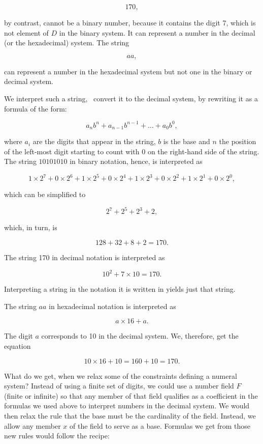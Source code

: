 \documentclass[tikz]{scrreprt}
\begin{document}
\[
170,
\]

by contrast, cannot be a binary number, because
it contains the digit 7, which is not element of $D$
in the binary system.
It can represent a number in the decimal (or the hexadecimal) system. 
The string

\[
aa,
\]

can represent a number in the hexadecimal system
but not one in the binary or decimal system.

We interpret such a string, \ie\ convert it
to the decimal system, by rewriting it 
as a formula of the form:

\[
a_nb^n + a_{n-1}b^{n-1} + \dots + a_0b^0,
\]

where $a_i$ are the digits that appear in the string,
$b$ is the base and $n$ the position of the left-most digit
starting to count with 0 on the right-hand side of the string.
The string $10101010$ in binary notation, hence, is interpreted as

\[
1\times 2^7 + 0\times 2^6 + 1\times 2^5 + 0\times 2^4 + 
1\times 2^3 + 0\times 2^2 + 1\times 2^1 + 0\times 2^0,
\]

which can be simplified to

\[
2^7 + 2^5 + 2^3 + 2,
\]

which, in turn, is

\[
128 + 32 + 8 + 2 = 170.
\]

The string 170 in decimal notation is interpreted as

\[
10^2 + 7\times 10 = 170.
\]

Interpreting a string in the notation it is written in
yields just that string.

The string $aa$ in hexadecimal notation is interpreted as

\[
a\times 16 + a.
\]

The digit $a$ corresponds to 10 in the decimal system.
We, therefore, get the equation

\[
10\times 16 + 10 = 160 + 10 = 170.
\]

What do we get, when we relax some of the constraints
defining a numeral system?
Instead of using a finite set of digits,
we could use a number field $F$ (finite or infinite)
so that any member of that field qualifies as a coefficient
in the formulas we used above to interpret numbers
in the decimal system. We would then relax the rule
that the base must be the cardinality of the field.
Instead, we allow any member $x$ of the field 
to serve as a base.
Formulas we get from those new rules would follow the recipe:
\end{document}
